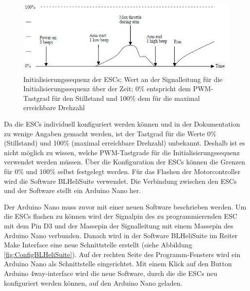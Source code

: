 \begin{figure}[H] %
\includegraphics[width=.90\textwidth]{sec4/images/BLDCInit} 
\centering
\captionsetup{width=.95\textwidth}
\caption[Initialisierungssequenz der \ac{ESC}s]{Initialisierungssequenz der \ac{ESC}s; Wert an der Signalleitung für die Initialisierungssequenz über der Zeit; 0\% entspricht dem \ac{PWM}-Tastgrad für den Stillstand und 100\% dem für die maximal erreichbare Drehzahl}\centering
\label{fig:initESC}
\end{figure}

Da die \ac{ESC}s individuell konfiguriert werden können und in der Dokumentation zu wenige Angaben gemacht werden, ist der Tastgrad für die Werte 0\% (Stillstand) und 100\% (maximal erreichbare Drehzahl) unbekannt. Deshalb ist es nicht möglich zu wissen, welche \ac{PWM}-Tastgrade für die Initialisierungssequenz verwendet werden müssen. Über die Konfiguration der \ac{ESC}s können die Grenzen für 0\% und 100\% selbst festgelegt werden. Für das Flashen der Motorcontroller wird die Software \glqq{}BLHeliSuite\grqq{} verwendet. Die Verbindung zwischen den \ac{ESC}s und der Software stellt ein Arduino Nano her.\vspace{11pt}

Der Arduino Nano muss zuvor mit einer neuen Software beschrieben werden. Um die \ac{ESC}s flashen zu können wird der Signalpin des zu programmierenden \ac{ESC} mit dem Pin D3 und der Massepin der Signalleitung mit einem Massepin des Arduino Nano verbunden. Danach wird in der Software \glqq{}BLHeliSuite\grqq{} im Reiter \glqq{}Make Interface\grqq{} eine neue Schnittstelle erstellt (siehe Abbildung \ref{fig:ConfigBLHeliSuite}). Auf der rechten Seite des Programm-Fensters wird ein Arduino Nano als Schnittstelle eingerichtet. Mit einem Klick auf den Button \glqq{}Arduino 4way-interface\grqq{} wird die neue Software, durch die die \ac{ESC}s neu konfiguriert werden können, auf den Arduino Nano geladen.


